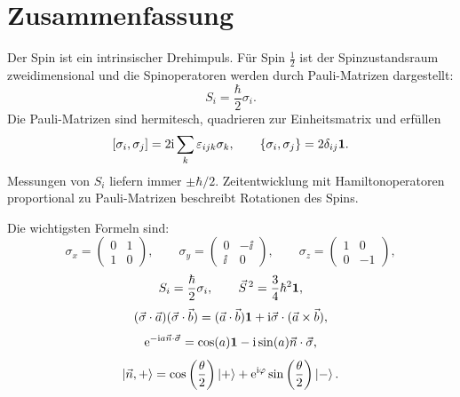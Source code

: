 \section{Zusammenfassung}

\begin{conceptbox}
Der Spin ist ein intrinsischer Drehimpuls. Für Spin \(\frac12\) ist der Spinzustandsraum zweidimensional und die Spinoperatoren werden durch Pauli-Matrizen dargestellt:
\[
    S_i=\frac{\hbar}{2}\sigma_i.
\]
Die Pauli-Matrizen sind hermitesch, quadrieren zur Einheitsmatrix und erfüllen
\[
    [\sigma_i,\sigma_j]=2\mathrm{i}\sum_k\varepsilon_{ijk}\sigma_k,
    \qquad
    \{\sigma_i,\sigma_j\}=2\delta_{ij}\mathbf{1}.
\]
Messungen von \(S_i\) liefern immer \(\pm\hbar/2\). Zeitentwicklung mit Hamiltonoperatoren proportional zu Pauli-Matrizen beschreibt Rotationen des Spins.
\end{conceptbox}

Die wichtigsten Formeln sind:
\[
    \sigma_x=
    \begin{pmatrix}0&1\\1&0\end{pmatrix},
    \qquad
    \sigma_y=
    \begin{pmatrix}0&-\ii\\\ii&0\end{pmatrix},
    \qquad
    \sigma_z=
    \begin{pmatrix}1&0\\0&-1\end{pmatrix},
\]
\[
    S_i=\frac{\hbar}{2}\sigma_i,
    \qquad
    \vec S^{\,2}=\frac34\hbar^2\mathbf{1},
\]
\[
    (\vec\sigma\cdot\vec a)(\vec\sigma\cdot\vec b)
    =(\vec a\cdot\vec b)\mathbf{1}+\mathrm{i}\vec\sigma\cdot(\vec a\times\vec b),
\]
\[
    \mathrm{e}^{-\mathrm{i} a\vec n\cdot\vec\sigma}
    =\cos(a)\mathbf{1}-\mathrm{i}\sin(a)\vec n\cdot\vec\sigma,
\]
\[
    \left|\vec n,+\right\rangle
    =\cos\left(\frac{\theta}{2}\right)\left|+\right\rangle
    +\mathrm{e}^{\mathrm{i}\varphi}\sin\left(\frac{\theta}{2}\right)\left|-\right\rangle.
\]
